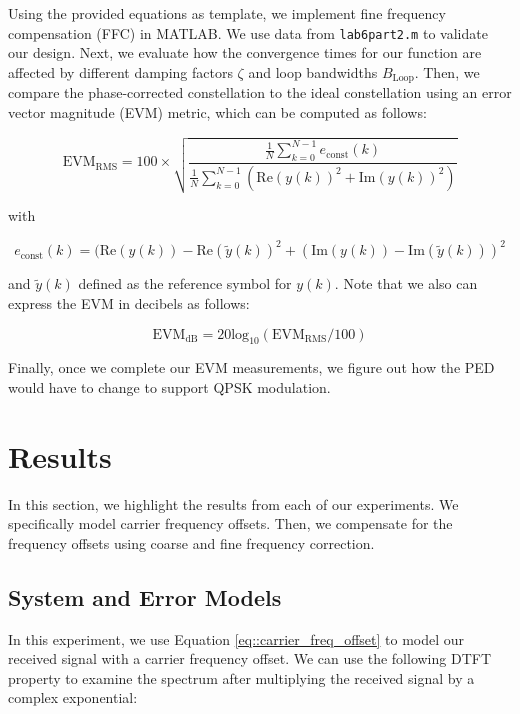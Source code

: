 \documentclass{article}
\begin{document}
Using the provided equations as template, we implement fine frequency compensation (FFC) in MATLAB. We use data from \texttt{lab6part2.m} to validate our design. Next, we evaluate how the convergence times for our function are affected by different damping factors $\zeta$ and loop bandwidths $B_\text{Loop}$. Then, we compare the phase-corrected constellation to the ideal constellation using an error vector magnitude (EVM) metric, which can be computed as follows:

\begin{equation}
	\text{EVM}_\text{RMS} = 100 \times \sqrt{\frac{\frac{1}{N}\sum_{k=0}^{N-1}{e_\text{const}(k)}}{\frac{1}{N}\sum_{k=0}^{N-1}{(\text{Re}(y(k))^2 + \text{Im}(y(k))^2)}}}
\end{equation}

\noindent with

\begin{equation}
	e_\text{const}(k) = (\text{Re}(y(k)) - \text{Re}(\tilde{y}(k))^2 + (\text{Im}(y(k)) - \text{Im}(\tilde{y}(k)))^2
\end{equation}

\noindent and $\tilde{y}(k)$ defined as the reference symbol for $y(k)$. Note that we also can express the EVM in decibels as follows:

\begin{equation}
	\text{EVM}_\text{dB} = 20\text{log}_{10}(\text{EVM}_\text{RMS}/100)
\end{equation}

\noindent Finally, once we complete our EVM measurements, we figure out how the PED would have to change to support QPSK modulation.

\section{Results}

In this section, we highlight the results from each of our experiments. We specifically model carrier frequency offsets. Then, we compensate for the frequency offsets using coarse and fine frequency correction.

\subsection{System and Error Models}

In this experiment, we use Equation \ref{eq::carrier_freq_offset} to model our received signal with a carrier frequency offset. We can use the following DTFT property to examine the spectrum after multiplying the received signal by a complex exponential:
\end{document}
